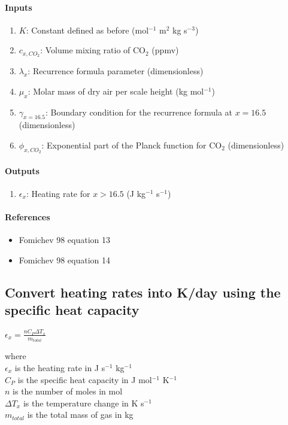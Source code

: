    \paragraph{Inputs}
   \begin{enumerate}
   \item $K$: Constant defined as before (mol$^{-1}$ m$^2$ kg s$^{-3}$)
   \item $c_{x,CO_2}$: Volume mixing ratio of CO$_2$ (ppmv)
   \item $\lambda_x$: Recurrence formula parameter (dimensionless)
   \item $\mu_x$: Molar mass of dry air per scale height (kg mol$^{-1}$)
   \item $\gamma_{x=16.5}$: Boundary condition for the recurrence formula 
     at $x = 16.5$ (dimensionless)
   \item $\phi_{x,CO_2}$: Exponential part of the Planck function for CO$_2$
     (dimensionless)
   \end{enumerate}

   \paragraph{Outputs}
   \begin{enumerate}
   \item $\epsilon_x$: Heating rate for $x > 16.5$ (J kg$^{-1}$ s$^{-1}$)
   \end{enumerate}

   \paragraph{References}
   \begin{itemize}
   \item Fomichev 98 equation 13
   \item Fomichev 98 equation 14
   \end{itemize}


\subsection{Convert heating rates into K/day using the specific heat 
    capacity } 

   $\epsilon_x = \frac{nC_P\Delta T_x}{m_{total}}$

   \noindent where\\
   $\epsilon_x$ is the heating rate in J s$^{-1}$ kg$^{-1}$ \\
   $C_P$ is the specific heat capacity in J mol$^{-1}$ K$^{-1}$ \\
   $n$ is the number of moles in mol \\
   $\Delta T_x$ is the temperature change in K s$^{-1}$ \\
   $m_{total}$ is the total mass of gas in kg 

